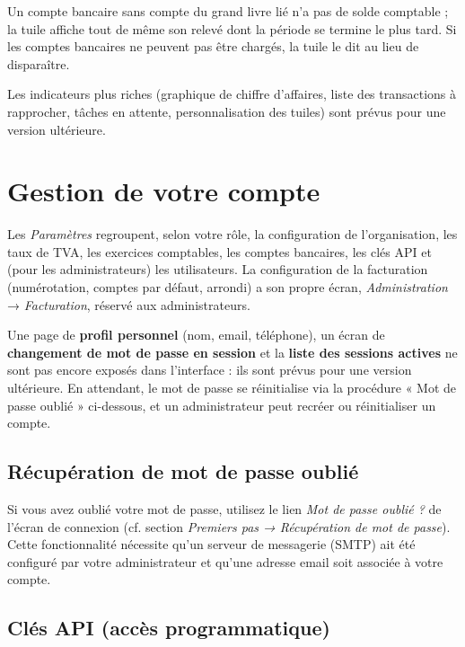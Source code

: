 \documentclass[a4paper,11pt,oneside]{article}
\begin{document}
Un compte bancaire sans compte du grand livre lié n'a pas de solde comptable ; la tuile
affiche tout de même son relevé dont la période se termine le plus tard. Si les comptes bancaires ne peuvent pas être
chargés, la tuile le dit au lieu de disparaître.

\begin{keshnote}
Les indicateurs plus riches (graphique de chiffre d'affaires, liste des
transactions à rapprocher, tâches en attente, personnalisation des tuiles) sont
prévus pour une version ultérieure.
\end{keshnote}

\section{Gestion de votre compte}

Les \emph{Paramètres} regroupent, selon votre rôle, la configuration de
l'organisation, les taux de TVA, les exercices comptables, les comptes bancaires,
les clés API et (pour les administrateurs) les utilisateurs. La configuration de la
facturation (numérotation, comptes par défaut, arrondi) a son propre écran,
\emph{Administration} → \emph{Facturation}, réservé aux administrateurs.

\begin{keshnote}
Une page de \textbf{profil personnel} (nom, email, téléphone), un écran de
\textbf{changement de mot de passe en session} et la \textbf{liste des sessions
actives} ne sont pas encore exposés dans l'interface : ils sont prévus pour une
version ultérieure. En attendant, le mot de passe se réinitialise via la
procédure « Mot de passe oublié » ci-dessous, et un administrateur peut recréer
ou réinitialiser un compte.
\end{keshnote}

\subsection{Récupération de mot de passe oublié}

Si vous avez oublié votre mot de passe, utilisez le lien \emph{Mot de passe oublié ?} de l'écran de connexion (cf. section \emph{Premiers pas → Récupération de mot de passe}). Cette fonctionnalité nécessite qu'un serveur de messagerie (SMTP) ait été configuré par votre administrateur et qu'une adresse email soit associée à votre compte.

\subsection{Clés API (accès programmatique)}
\end{document}

